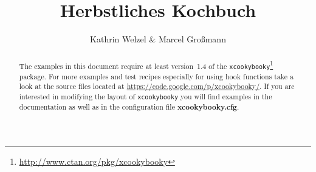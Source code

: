 \documentclass[%
a4paper,
twoside,
11pt
]{article}
\begin{document}
\title{Herbstliches Kochbuch}
\author{Kathrin Welzel \& Marcel Gro{\ss}mann}
\maketitle

\begin{abstract}
    \noindent The examples in this document require at least version~1.4 of the \texttt{xcookybooky}\footnote{\url{http://www.ctan.org/pkg/xcookybooky}} package. For more examples and test recipes especially for using hook functions take a look at the source files located at \url{https://code.google.com/p/xcookybooky/}. If you are interested in modifying the layout of \texttt{xcookybooky} you will find examples in the documentation as well as in the configuration file \textbf{xcookybooky.cfg}.
\end{abstract}

\tableofcontents

\vspace{5em}


\end{document}
